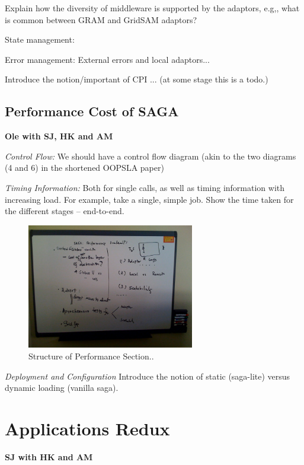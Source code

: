 \documentclass[10pt,letterpaper]{article}
\newcommand{\up}{\vspace*{-0.25em}}
\begin{document}
Explain how the diversity of middleware is supported by the adaptors,
e.g,, what is common between GRAM and GridSAM adaptors?

State management:

Error management: External errors and local adaptors...

Introduce the notion/important of CPI ... (at some stage this is a
todo.)

\subsection{Performance Cost of SAGA}{\bf Ole with SJ,
  HK and AM}

{\it Control Flow:} We should have a control flow diagram (akin to the
two diagrams (4 and 6) in the shortened OOPSLA paper)


{\it Timing Information:} Both for single calls, as well as timing
information with increasing load.  For example, take a single, simple
job. Show the time taken for the different stages -- end-to-end.


\begin{figure}[!ht]
  \up\up
  \begin{center}
      \includegraphics[width=0.65\textwidth]{../figures/ole_board-01.jpg}
 \end{center}
  \up\up\up\up\up\up\up\up\up\up
  \caption{\small Structure of Performance Section..}
 \label{stuff..}
\end{figure}


{\it Deployment and Configuration} Introduce the notion of static
(saga-lite) versus dynamic loading (vanilla saga).



\section{Applications Redux}{\bf SJ with HK and AM}
\end{document}
